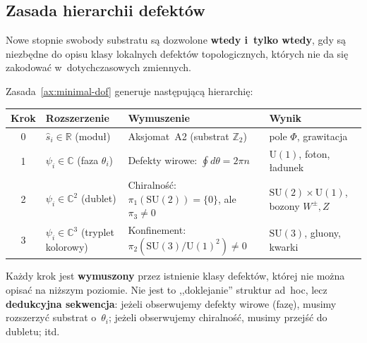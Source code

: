 \subsection{Zasada hierarchii defekt\'ow}\label{ssec:defect-hierarchy}

\begin{axiom}%
\label{ax:minimal-dof}
Nowe stopnie swobody substratu s\k{a} dozwolone \textbf{wtedy i~tylko wtedy},
gdy s\k{a} niezb\k{e}dne do opisu klasy lokalnych defekt\'ow topologicznych,
kt\'orych nie da si\k{e} zakodowa\'c w~dotychczasowych zmiennych.
\end{axiom}

\begin{uwaga}
\label{rem:defect-hierarchy-steps}
Zasada~\ref{ax:minimal-dof} generuje nast\k{e}puj\k{a}c\k{a} hierarchi\k{e}:
\begin{center}\small
\begin{tabular}{clll}
\toprule
\textbf{Krok} & \textbf{Rozszerzenie} & \textbf{Wymuszenie} & \textbf{Wynik} \\
\midrule
0 & $\hat{s}_i \in \mathbb{R}$ (modu\l{})
  & Aksjomat~A2 (substrat $\mathbb{Z}_2$)
  & pole $\Phi$, grawitacja \\[3pt]
1 & $\psi_i \in \mathbb{C}$ (faza $\theta_i$)
  & Defekty wirowe: $\oint d\theta = 2\pi n$
  & $\mathrm{U}(1)$, foton, \l{}adunek \\[3pt]
2 & $\psi_i \in \mathbb{C}^2$ (dublet)
  & Chiralno\'s\'c: $\pi_1(\mathrm{SU}(2)) = \{0\}$,
    ale $\pi_3 \neq 0$
  & $\mathrm{SU}(2) \times \mathrm{U}(1)$, bozony $W^\pm, Z$ \\[3pt]
3 & $\psi_i \in \mathbb{C}^3$ (tryplet kolorowy)
  & Konfinement: $\pi_2(\mathrm{SU}(3)/\mathrm{U}(1)^2) \neq 0$
  & $\mathrm{SU}(3)$, gluony, kwarki \\
\bottomrule
\end{tabular}
\end{center}
Ka\.zdy krok jest \textbf{wymuszony} przez istnienie klasy defekt\'ow,
kt\'orej nie mo\.zna opisa\'c na ni\.zszym poziomie.
Nie jest to ,,doklejanie'' struktur ad~hoc, lecz \textbf{dedukcyjna
sekwencja}: je\.zeli obserwujemy defekty wirowe (faz\k{e}), musimy
rozszerzy\'c substrat o~$\theta_i$; je\.zeli obserwujemy chiralno\'s\'c,
musimy przej\'s\'c do dubletu; itd.
\end{uwaga}

